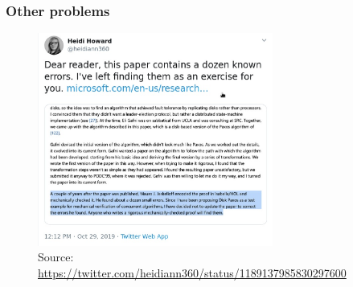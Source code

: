 \documentclass[10pt,utf8]{beamer}
\begin{document}
\begin{frame}
 \frametitle{Other problems}
 \centering
 \begin{figure}
        \centering
        \includegraphics[height=7cm]{./img/howard_disk_paxos.eps}
        \caption{\tiny{Source: \url{https://twitter.com/heidiann360/status/1189137985830297600}}}
    \end{figure}
\end{frame}
    
\end{document}
